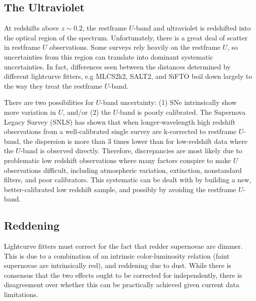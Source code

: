 \documentclass{nature1}
\begin{document}
\subsection{The Ultraviolet}\label{uv}
At redshifts above $z\sim 0.2$, the restframe $U$-band and
ultraviolet is redshifted into the optical region of the spectrum.
Unfortunately, there is a great deal of scatter in restframe $U$
observations.  Some surveys rely heavily on the restframe $U$, so uncertainties from this region can translate into dominant
systematic uncertainties\citep{2009ApJS..185...32K}.  In fact, differences
seen between the distances determined by different lightcurve fitters,
e.g MLCS2k2\citep{2007ApJ...659..122J},
SALT2\citep{2007A&A...466...11G}, and SiFTO\citep{2008ApJ...681..482C}
boil down largely to the way they treat the restframe $U$-band.

There are two possibilities for $U$-band uncertainty: (1) SNe
intrinsically show more variation in $U$\citep{2008ApJ...674...51E},
and/or (2) the $U$-band is poorly calibrated.  The Supernova Legacy Survey (SNLS) has shown that
when longer-wavelength high redshift observations from a
well-calibrated single survey are k-corrected to restframe $U$-band,
the dispersion is more than 3 times lower than for low-redshift data
where the $U$-band is observed directly\citep{2006A&A...447...31A}.
Therefore, discrepancies are most likely due to problematic low
redshift observations where many factors conspire to make $U$
observations difficult, including atmospheric variation, extinction,
nonstandard filters, and poor calibrators\citep{2006AJ....131..527J}.
This systematic can be dealt with by building a new, better-calibrated
low redshift sample, and possibly by avoiding the restframe $U$-band.

\subsection{Reddening}\label{reddening}
Lightcurve fitters must correct for the fact that redder supernovae
are dimmer.  This is due to a combination of an intrinsic
color-luminosity relation (faint supernovae are intrinsically
red\citep{1996ApJ...473...88R}), and reddening due to dust.  While
there is consensus that the two effects ought to be corrected for
independently, there is disagreement over whether this can be
practically achieved given current data limitations.
\end{document}
